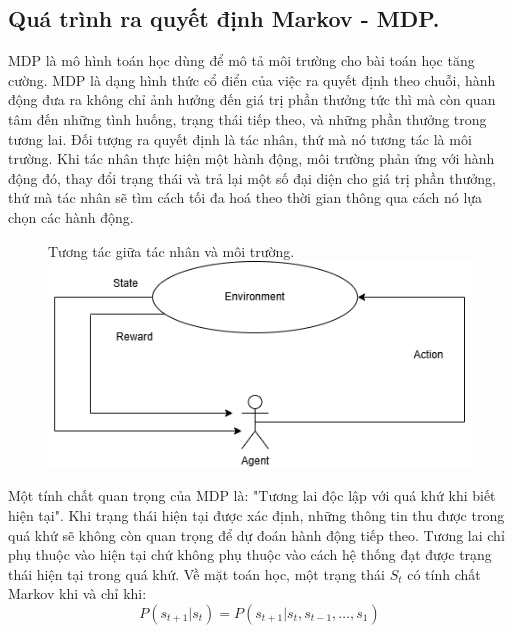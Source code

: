 \documentclass{uetgraduation}
\begin{document}
\subsection{Quá trình ra quyết định Markov - MDP.}
MDP là mô hình toán học dùng để mô tả môi trường cho bài toán học tăng cường. MDP là dạng hình thức cổ điển của việc ra quyết định theo chuỗi, hành động đưa ra không chỉ ảnh hưởng đến giá trị phần thưởng
tức thì mà còn quan tâm đến những tình huống, trạng thái tiếp theo, và những phần thưởng trong tương lai. Đối tượng ra quyết định là tác nhân, thứ mà nó tương tác là môi trường. Khi tác nhân thực hiện một
hành động, môi trường phản ứng với hành động đó, thay đổi trạng thái và trả lại một số đại diện cho giá trị phần thưởng, thứ mà tác nhân sẽ tìm cách tối đa hoá theo thời gian thông qua cách nó lựa chọn các
hành động.
\begin{figure}{Tương tác giữa tác nhân và môi trường.}
    \centering
    \includegraphics[scale=0.5]{mdp}
    \label{fig:mdp}
\end{figure}

Một tính chất quan trọng của MDP là: "Tương lai độc lập với quá khứ khi biết hiện tại". Khi trạng thái hiện tại được xác định, những thông tin thu được trong quá khứ sẽ không còn quan trọng để
dự đoán hành động tiếp theo. Tương lai chỉ phụ thuộc vào hiện tại chứ không phụ thuộc vào cách hệ thống đạt được trạng thái hiện tại trong quá khứ.
Về mặt toán học, một trạng thái $S_t$ có tính chất Markov khi và chỉ khi:
\[
P(s_{t+1} | s_t) = P(s_{t+1} | s_t, s_{t-1},\dots, s_1)
\]
\end{document}
